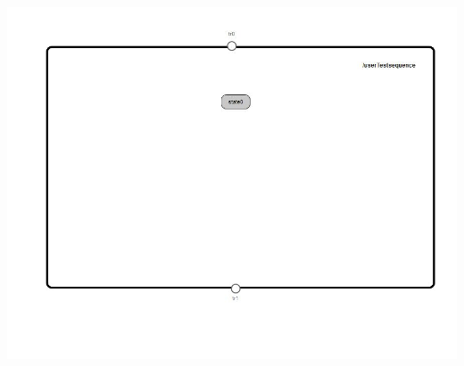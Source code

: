 \begin{par}

\end{par}

{
\centering{}
\includegraphics[width=1.0\textwidth]{./images/ABasicCommunicationTest__userTestsequence_behavior.jpg}
}

\begin{par}

\end{par}
	


